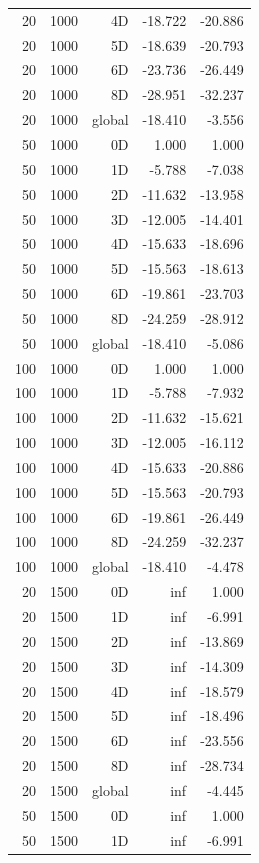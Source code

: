 \begin{longtable}{rrrrr}
20 & 1000 & 4D & -18.722 & -20.886 \\
20 & 1000 & 5D & -18.639 & -20.793 \\
20 & 1000 & 6D & -23.736 & -26.449 \\
20 & 1000 & 8D & -28.951 & -32.237 \\
20 & 1000 & global & -18.410 & -3.556 \\
50 & 1000 & 0D & 1.000 & 1.000 \\
50 & 1000 & 1D & -5.788 & -7.038 \\
50 & 1000 & 2D & -11.632 & -13.958 \\
50 & 1000 & 3D & -12.005 & -14.401 \\
50 & 1000 & 4D & -15.633 & -18.696 \\
50 & 1000 & 5D & -15.563 & -18.613 \\
50 & 1000 & 6D & -19.861 & -23.703 \\
50 & 1000 & 8D & -24.259 & -28.912 \\
50 & 1000 & global & -18.410 & -5.086 \\
100 & 1000 & 0D & 1.000 & 1.000 \\
100 & 1000 & 1D & -5.788 & -7.932 \\
100 & 1000 & 2D & -11.632 & -15.621 \\
100 & 1000 & 3D & -12.005 & -16.112 \\
100 & 1000 & 4D & -15.633 & -20.886 \\
100 & 1000 & 5D & -15.563 & -20.793 \\
100 & 1000 & 6D & -19.861 & -26.449 \\
100 & 1000 & 8D & -24.259 & -32.237 \\
100 & 1000 & global & -18.410 & -4.478 \\
20 & 1500 & 0D & inf & 1.000 \\
20 & 1500 & 1D & inf & -6.991 \\
20 & 1500 & 2D & inf & -13.869 \\
20 & 1500 & 3D & inf & -14.309 \\
20 & 1500 & 4D & inf & -18.579 \\
20 & 1500 & 5D & inf & -18.496 \\
20 & 1500 & 6D & inf & -23.556 \\
20 & 1500 & 8D & inf & -28.734 \\
20 & 1500 & global & inf & -4.445 \\
50 & 1500 & 0D & inf & 1.000 \\
50 & 1500 & 1D & inf & -6.991 \\

\end{longtable}

